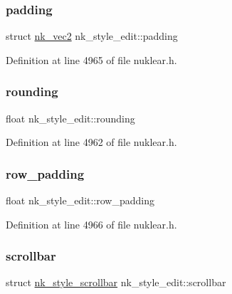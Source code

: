 \subsubsection{\texorpdfstring{padding}{padding}}
{\footnotesize\ttfamily struct \mbox{\hyperlink{structnk__vec2}{nk\+\_\+vec2}} nk\+\_\+style\+\_\+edit\+::padding}



Definition at line 4965 of file nuklear.\+h.

\mbox{\label{structnk__style__edit_a8ece09a4dd8ad3751b4f8f018b7d031e}} 
\subsubsection{\texorpdfstring{rounding}{rounding}}
{\footnotesize\ttfamily float nk\+\_\+style\+\_\+edit\+::rounding}



Definition at line 4962 of file nuklear.\+h.

\mbox{\label{structnk__style__edit_ad3e38663299850e384418c2434dc9345}} 
\subsubsection{\texorpdfstring{row\+\_\+padding}{row\_padding}}
{\footnotesize\ttfamily float nk\+\_\+style\+\_\+edit\+::row\+\_\+padding}



Definition at line 4966 of file nuklear.\+h.

\mbox{\label{structnk__style__edit_a6e07fcf853df1fa96f9ccdd2f09621fe}} 
\subsubsection{\texorpdfstring{scrollbar}{scrollbar}}
{\footnotesize\ttfamily struct \mbox{\hyperlink{structnk__style__scrollbar}{nk\+\_\+style\+\_\+scrollbar}} nk\+\_\+style\+\_\+edit\+::scrollbar}



